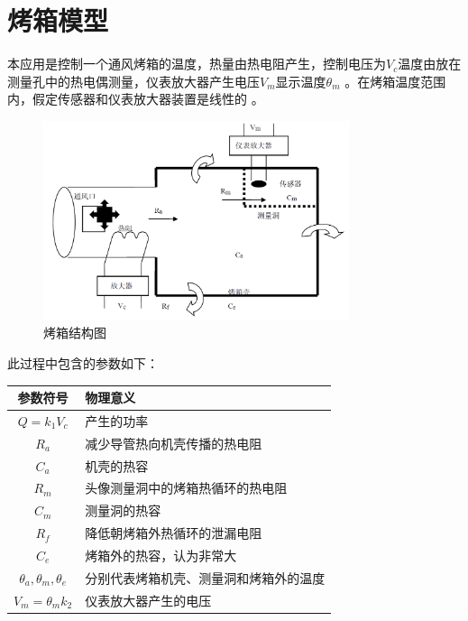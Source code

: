 \documentclass[11pt]{article}
\begin{document}
\newpage


\setcounter{tocdepth}{3}
\tableofcontents
\newpage

\setcounter{page}{1}
\section{烤箱模型}
本应用是控制一个通风烤箱的温度，热量由热电阻产生，控制电压为$V_c$温度由放在测量孔中的热电偶测量，仪表放大器产生电压$V_m $显示温度$ \theta_m$ 。在烤箱温度范围内，假定传感器和仪表放大器装置是线性的 。
\begin{figure}[H]
  \centering
  \includegraphics[width=0.8\textwidth]{烤箱结构图.png}
  \caption{烤箱结构图}
  \label{fig:烤箱结构图}
\end{figure}
此过程中包含的参数如下：
\begin{table}[H]
  \centering
  \renewcommand{\arraystretch}{1.5}
  \begin{tabular}{c|l}
    \hline
    参数符号                         & 物理意义                \\
    \hline
    $Q=k_1V_c$                   & 产生的功率               \\
    $R_a$                        & 减少导管热向机壳传播的热电阻      \\
    $C_a$                        & 机壳的热容               \\
    $R_m$                        & 头像测量洞中的烤箱热循环的热电阻    \\
    $C_m$                        & 测量洞的热容              \\
    $R_f$                        & 降低朝烤箱外热循环的泄漏电阻      \\
    $C_e$                        & 烤箱外的热容，认为非常大        \\
    $\theta_a,\theta_m,\theta_e$ & 分别代表烤箱机壳、测量洞和烤箱外的温度 \\
    $V_m=\theta_mk_2$            & 仪表放大器产生的电压          \\
    \hline
  \end{tabular}
\end{table}
\end{document}

